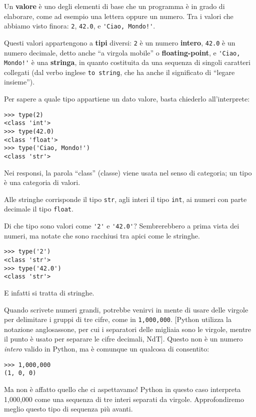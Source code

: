 \documentclass[10pt]{book}
\begin{document}
Un {\bf valore} è uno degli elementi di base che un programma è in grado di elaborare, come ad esempio una lettera oppure un numero. Tra i valori che abbiamo visto finora: 
{\tt 2}, {\tt 42.0}, e \verb"'Ciao, Mondo!'".

Questi valori appartengono a {\bf tipi} diversi:
{\tt 2} è un numero {\bf intero}, {\tt 42.0} è un numero decimale, detto anche ``a virgola mobile'' o {\bf floating-point}, e \verb"'Ciao, Mondo!'" è una {\bf stringa}, in quanto costituita da una sequenza di singoli caratteri collegati (dal verbo inglese \verb"to string", che ha anche il significato di ``legare insieme'').

Per sapere a quale tipo appartiene un dato valore, basta chiederlo all'interprete:

\begin{verbatim}
>>> type(2)
<class 'int'>
>>> type(42.0)
<class 'float'>
>>> type('Ciao, Mondo!')
<class 'str'>
\end{verbatim}
%

Nei responsi, la parola ``class'' (classe) viene usata nel senso di categoria; un tipo è una categoria di valori.

Alle stringhe corrisponde il tipo {\tt str}, agli interi il
tipo {\tt int}, ai numeri con parte decimale il tipo {\tt float}.

Di che tipo sono valori come \verb"'2'" e \verb"'42.0'"?
Sembrerebbero a prima vista dei numeri, ma notate che sono racchiusi tra apici come le stringhe. 

\begin{verbatim}
>>> type('2')
<class 'str'>
>>> type('42.0')
<class 'str'>
\end{verbatim}
%
E infatti si tratta di stringhe.

Quando scrivete numeri grandi, potrebbe venirvi in mente di usare delle virgole per delimitare i gruppi di tre cifre, come in {\tt 1,000,000}. [Python utilizza la notazione anglosassone, per cui i separatori delle migliaia sono le virgole, mentre il punto è usato per separare le cifre decimali, NdT]. Questo non è un numero {\em intero} valido in Python, ma è comunque un qualcosa di consentito:

\begin{verbatim}
>>> 1,000,000
(1, 0, 0)
\end{verbatim}
%
Ma non è affatto quello che ci aspettavamo! Python in questo caso interpreta 1,000,000 come una sequenza di tre interi separati da virgole. Approfondiremo meglio questo tipo di sequenza più avanti.
\end{document}
